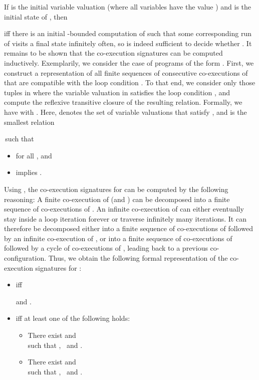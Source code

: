 \documentclass[submission,copyright,creativecommons]{eptcs}
\begin{document}
If  is the initial variable valuation (where all variables have the value
) and  is the initial state of , then

iff there is an initial -bounded computation of  such that some
corresponding run of  visits a final state infinitely often,
so  is indeed sufficient to decide whether
.
It remains to be shown that the co-execution signatures can be computed
inductively.
Exemplarily, we consider the case of programs of the form
.
First, we construct a representation 
of all finite sequences of consecutive
co-executions of  that are compatible with the loop condition .
To that end, we consider only
those tuples  in 
where the variable valuation in 
satisfies the loop condition , and compute the reflexive transitive closure
of the resulting relation.
Formally, we have
 with
.
Here,  denotes the set of variable valuations that satisfy ,
and  is the smallest relation

\,such that
\begin{itemize}
	\item  for all , and
	\item  implies .
\end{itemize}

Using ,
the co-execution signatures for  can be
computed by the following reasoning:
A finite co-execution of
 (and )
can be decomposed into a finite sequence of co-executions of .
An infinite co-execution of  can either eventually stay
inside a loop iteration forever or traverse infinitely many iterations.
It can therefore be decomposed either into a finite sequence of
co-executions of  followed by an infinite co-execution
of ,
or into a finite sequence of co-executions of  followed by
a cycle of co-executions of , leading back to a previous
co-configuration.
Thus, we obtain the following formal representation of the co-execution
signatures for :

\begin{itemize}
	\item  \; iff \;
		
		and .
	\item  iff at least one of the following holds:
		\begin{itemize}
			\item There exist  and
				 \\
				such that
				, \,
				 and
				.
			\item There exist  and
				 \\
				such that
				, \,
				 and
				.
		\end{itemize}
\end{itemize}
\end{document}

